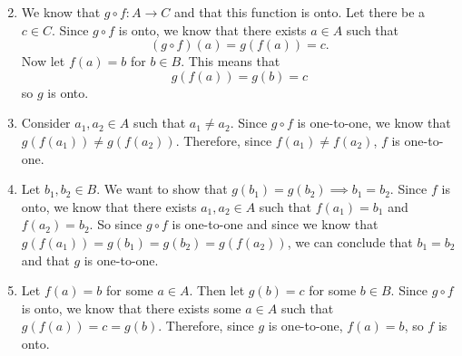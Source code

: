 \documentclass{report}
\begin{document}
\begin{enumerate}[label=\alph*.]
    \setcounter{enumi}{1}
    \item We know that $g \circ f : A \to C$ and that this function is onto. Let there be a $c \in C$. Since $g \circ f$ is onto, we know that there exists $a \in A$ such that $$(g \circ f)(a) = g(f(a)) = c.$$ Now let $f(a) = b$ for $b \in B$. This means that $$g(f(a)) = g(b) = c$$ so $g$ is onto.
    \item Consider $a_1, a_2 \in A$ such that $a_1 \neq a_2$. Since $g \circ f$ is one-to-one, we know that $g(f(a_1)) \neq g(f(a_2))$. Therefore, since $f(a_1) \neq f(a_2)$, $f$ is one-to-one.
    \item Let $b_1, b_2 \in B$. We want to show that $g(b_1) = g(b_2) \implies b_1 = b_2$. Since $f$ is onto, we know that there exists $a_1, a_2 \in A$ such that $f(a_1) = b_1$ and $f(a_2) = b_2$. So since $g \circ f$ is one-to-one and since we know that $g(f(a_1)) = g(b_1) = g(b_2) = g(f(a_2))$, we can conclude that $b_1 = b_2$ and that $g$ is one-to-one.
    \item Let $f(a) = b$ for some $a \in A$. Then let $g(b) = c$ for some $b \in B$. Since $g \circ f$ is onto, we know that there exists some $a \in A$ such that $g(f(a)) = c = g(b)$. Therefore, since $g$ is one-to-one, $f(a) = b$, so $f$ is onto. 
\end{enumerate}


\sol
\end{document}
